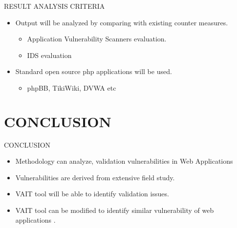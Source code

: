 \documentclass[xcolor=x11names,compress]{beamer}
\renewcommand{\(}{\begin{columns}}
\renewcommand{\)}{\end{columns}}
\newcommand{\<}[1]{\begin{column}{#1}}
\renewcommand{\>}{\end{column}}
\begin{document}


\begin{frame}{RESULT ANALYSIS CRITERIA}
	\begin{itemize}
		\item Output will be analyzed by comparing with existing counter measures.\newline
		\begin{itemize}
			\item Application Vulnerability Scanners evaluation.
			\newline
			\item  IDS evaluation \newline
			
		\end{itemize}
		\item Standard open source php applications will be used.\newline
		\begin{itemize}
			\item phpBB, TikiWiki, DVWA etc
		\end{itemize} 
	\end{itemize}
\end{frame}

\section{CONCLUSION}
\begin{frame}
\end{frame}
\begin{frame}{CONCLUSION}
	\begin{itemize}
		\item Methodology can analyze, validation vulnerabilities in Web Applications \newline
		\item Vulnerabilities are derived from extensive field study.\newline
		\item VAIT tool will be able to identify validation issues.\newline
		\item VAIT tool can be modified to identify similar vulnerability of web applications .
	\end{itemize}
\end{frame}
\end{document}
